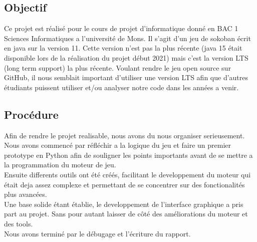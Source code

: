 \documentclass[../main.tex]{subfiles}
\begin{document}
\subsection{Objectif}
Ce projet est réalisé pour le cours de projet d'informatique donné en BAC 1 Sciences Informatiques a l'université de Mons.
Il s'agit d'un jeu de sokoban écrit en java sur la version 11.
Cette version n'est pas la plus récente (java 15 était disponible lors de la réalisation du projet début 2021) mais c'est la version LTS (long term support) la plus récente.
Voulant rendre le jeu open source sur GitHub, il nous semblait important d'utiliser une version LTS afin que d'autres étudiants puissent utiliser et/ou analyser notre code dans les années a venir.

\subsection{Procédure}
Afin de rendre le projet realisable, nous avons du nous organiser serieusement. \\
Nous avons commencé par réfléchir a la logique du jeu et faire un premier prototype en Python afin de souligner les points importants avant de se mettre a la programmation du moteur de jeu. \\
Ensuite differents outils ont été créés, facilitant le developpement du moteur qui était deja assez complexe et permettant de se concentrer sur des fonctionalités plus avancées. \\
Une base solide étant établie, le developpement de l'interface graphique a pris part au projet. Sans pour autant laisser de côté des améliorations du moteur et des tools. \\
Nous avons terminé par le débugage et l'écriture du rapport.

\newpage
\end{document}
